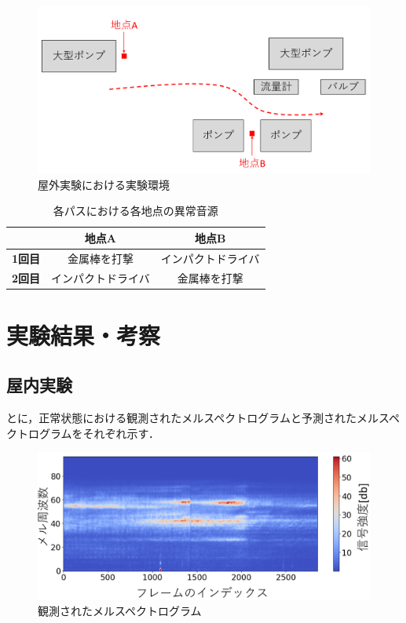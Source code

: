 \documentclass{/workdir/classes/summary}
\begin{document}
\begin{figure}[t]
  \centering
  \includegraphics[keepaspectratio, width=1.0\linewidth]{field_environment.png}
  \caption{屋外実験における実験環境}
  \label{fig:field_environment}
\end{figure}

\begin{table}[htbp]
  \centering
  \caption{各パスにおける各地点の異常音源}
  \label{tab:abnormal_sound_jp}
  \begin{tabular}{c|c|c}
  \hline
   & \textbf{地点A} & \textbf{地点B} \\ \hline
  \textbf{1回目} & 金属棒を打撃 & インパクトドライバ \\
  \textbf{2回目} & インパクトドライバ & 金属棒を打撃 \\ \hline
  \end{tabular}
\end{table}

\section{実験結果・考察}
\subsection{屋内実験}
とに，正常状態における観測されたメルスペクトログラムと予測されたメルスペクトログラムをそれぞれ示す．
\begin{figure}[t]
  \centering
  \includegraphics[keepaspectratio, width=1.0\linewidth]{observed_mel.png}
  \caption{観測されたメルスペクトログラム}
  \label{fig:observed_mel}
\end{figure}
\end{document}
